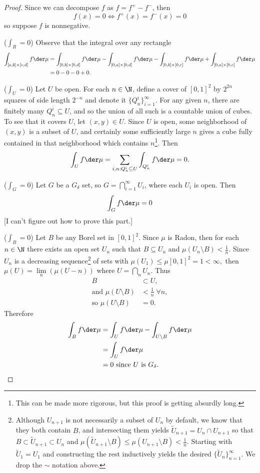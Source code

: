 \documentclass[12pt,letterpaper]{article}
\begin{document}
\begin{enumerate}
\begin{proof}Since we can decompose $f$ as $f=f^+-f^-$, then 
$$f(x)=0\iff f^+(x)=f^-(x)=0$$ 
so \Wlog{} suppose $f$ is nonnegative.

($\int_R=0$) Observe that the integral over any rectangle
\begin{align*}
\int_{[a,b]\times[c,d]}  f\der\mu
&= \int_{[0,b]\times[0,d]}  f\der\mu 
	- \int_{[0,a]\times[0,d]}  f\der\mu 
	- \int_{[0,b]\times[0,c]}  f\der\mu 
	+ \int_{[0,a]\times[0,c]}  f\der\mu \\
&= 0-0-0+0.
\end{align*}

($\int_U=0$) Let $U$ be open. For each $n\in\N$, define a cover of $[0,1]^2$ by $2^{2n}$ squares of side length $2^{-n}$ and denote it $\{Q_n^i\}_{i=1}^\infty$. For any given $n$, there are finitely many $Q_n^i\subseteq U$, and so the union of all such is a countable union of cubes. To see that it covers $U$, let $(x,y)\in U$. Since $U$ is open, some neighborhood of $(x,y)$ is a subset of $U$, and certainly some sufficiently large $n$ gives a cube fully contained in that neighborhood which contains $n$\footnote{This can be made more rigorous, but this proof is getting absurdly long.}. Then 
$$\int_U f\der\mu = \sum_{i,n:Q_n^i\subseteq U} \int_{Q_n^i} f\der\mu = 0.$$

($\int_G=0$) Let $G$ be a $G_\delta$ set, so $G=\bigcap_{i=1}^\infty U_i$, where each $U_i$ is open. Then 
$$\int_G f\der\mu = 0$$
[I can't figure out how to prove this part.]

($\int_B=0$) Let $B$ be any Borel set in $[0,1]^2$. Since $\mu$ is Radon, then for each $n\in\N$ there exists an open set $U_n$ such that $B\subseteq U_n$ and $\mu(U_n\setminus B)<\frac{1}{n}$. Since $U_n$ is a decreasing sequence\footnote{Although $U_{n+1}$ is not necessarily a subset of $U_n$ by default, we know that they both contain $B$, and intersecting them yields $\tilde{U}_{n+1}=U_n \cap U_{n+1}$ so that $B\subset \tilde{U}_{n+1} \subset U_n$ and $\mu(\tilde{U}_{n+1}\setminus B)\leq \mu({U}_{n+1}\setminus B) < \frac{1}{n}$. Starting with $\tilde{U}_1=U_1$ and constructing the rest inductively yields the desired $\{\tilde{U}_n\}_{n=1}^\infty$. We drop the $\sim$ notation above.}
of sets with $\mu(U_1)\leq\mu[0,1]^2=1<\infty,$  then $\mu(U)=\lim\limits_n(\mu(U-n))$ where $U=\bigcap\limits_n U_n$. Thus 
\begin{align*}
B&\subset U, \\
\text{and } \mu(U\setminus B)&< \frac{1}{n} \; \forall n, \\
\text{so } \mu(U\setminus B)&=0.
\end{align*}
Therefore 
\begin{align*}
\int_B f\der\mu &= \int_U f\der\mu - \int_{U\setminus B} f\der\mu \\
&= \int_U f\der\mu \\
&=0 \text{ since }U\text{ is }G_\delta.
\end{align*}


\end{proof}
\end{enumerate}
\end{document}
